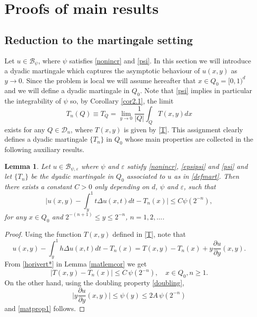 \documentclass[11pt,letterpaper]{amsart}
\newtheorem{lem}{Lemma}[section]
\theoremstyle{definition}
\numberwithin{equation}{section}
\begin{document}
\section{Proofs of main results}

\subsection{Reduction to the martingale setting}
Let $u \in \mathcal{B}_{\psi}$, where $\psi$ satisfies \eqref{nonincr} and \eqref{psi}. In this section we will introduce a dyadic martingale which captures the asymptotic behaviour  of $u(x,y)$ as $y\to 0$. Since the problem is local we will assume hereafter that $x\in Q_0 = [0,1)^d$ and we will define a dyadic martingale in $Q_0$. Note that \eqref{psi} implies in particular the integrability of $\psi$ so, by Corollary \ref{cor2.1}, the limit 
\begin{equation}\label{defmart}
  T_n(Q) \equiv T_Q = \lim_{y \to 0} \frac{1}{|Q|} \int_Q T(x,y) dx
\end{equation}
exists for any $Q\in \mathcal{D}_n$, where $T(x,y)$ is given by \eqref{T}. This assignment clearly defines a dyadic martingale $\{ T_n \}$ in $Q_0$ whose main properties are collected  in the following auxiliary results.




\begin{lem} \label{martpropert}
\noindent Let $u\in  \mathcal{B}_{\psi , \varepsilon }$ where $\psi$ and $\varepsilon$ satisfy \eqref{nonincr}, \eqref{epsipsi} and \eqref{psi} and let $\{ T_n \}$ be the dyadic martingale in $Q_0$ associated to $u$ as in \eqref{defmart}. Then there exists a constant $C>0$ only depending on $d$, $\psi$ and $\varepsilon$, such that 
\begin{equation}\label{matprop1}
 \Big | u(x,y) - \int_y^1 t \Delta u(x,t) dt - T_n (x) \Big | \leq C \psi (2^{-n}), 
\end{equation}
for any $x\in Q_0$ and  $2^{-(n+1)} \leq y \leq 2^{-n}$, $n=1,2, \ldots$.
\end{lem}

\begin{proof}
Using the function $T(x,y)$ defined in \eqref{T}, note that 
$$
u(x,y) - \int_y^1 h \Delta u(x,t) dt - T_n(x) = T(x,y) - T_n (x) + y \frac{\partial u}{\partial y}(x,y) . 
$$
From \eqref{horivert*} in Lemma \ref{matlemcor} we get
$$
|T(x,y) - T_n (x) | \leq C \, \psi (2^{-n}), \quad x \in Q_0 , n \geq 1 . 
$$
On the other hand, using the doubling property \eqref{doubling}, 
$$
\big | y \frac{\partial u}{\partial y}(x,y) \big | \leq \psi (y) \leq 2 A \, \psi (2^{-n})
$$
and \eqref{matprop1} follows.
\end{proof}
\end{document}
